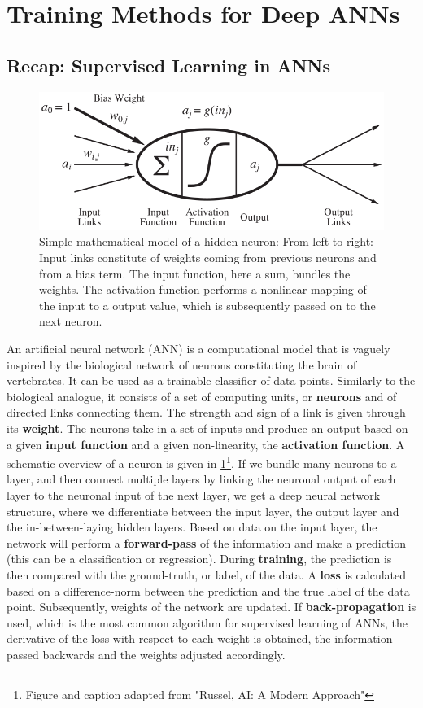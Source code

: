 \documentclass[main]{subfiles}
\begin{document}
\newpage
\section{Training Methods for Deep ANNs}\label{sec:training}
\subsection{Recap: Supervised Learning in ANNs}

\begin{figure}[H]
		\centering
		\includegraphics[width=0.8\linewidth]{02_TrainingMethodsForDeepANNs/figures/neuron.png}
		\caption{Simple mathematical model of a hidden neuron: From left to right: Input links constitute of weights coming from previous neurons and from a bias term. The input function, here a sum, bundles the weights. The activation function performs a nonlinear mapping of the input to a output value, which is subsequently passed on to the next neuron.}
		\label{fig:neuron}
	\end{figure}
	
	An artificial neural network (ANN) is a computational model that is vaguely inspired by the biological network of neurons constituting the brain of vertebrates. It can be used as a trainable classifier of data points. Similarly to the biological analogue, it consists of a set of computing units, or \textbf{neurons} and of directed links connecting them. The strength and sign of a link is given through its \textbf{weight}. The neurons take in a set of inputs and produce an output based on a given \textbf{input function} and a given non-linearity, the \textbf{activation function}. A schematic overview of a neuron is given in \cref{fig:neuron}\footnote{Figure and caption adapted from "Russel, AI: A Modern Approach"}. If we bundle many neurons to a layer, and then connect multiple layers by linking the neuronal output of each layer to the neuronal input of the next layer, we get a deep neural network structure, where we differentiate between the input layer, the output layer and the in-between-laying hidden layers. Based on data on the input layer, the network will perform a \textbf{forward-pass} of the information and make a prediction (this can be a classification or regression). During \textbf{training}, the prediction is then compared with the ground-truth, or label, of the data. A \textbf{loss} is calculated based on a difference-norm between the prediction and the true label of the data point. Subsequently, weights of the network are updated. If \textbf{back-propagation} is used, which is the most common algorithm for supervised learning of ANNs, the derivative of the loss with respect to each weight is obtained, the information passed backwards and the weights adjusted accordingly. 
	
\end{document}
